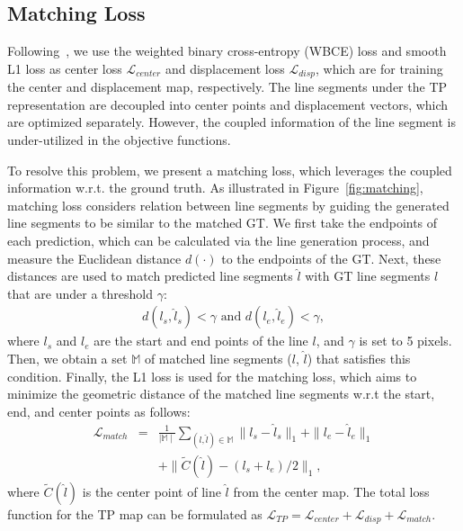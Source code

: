 \documentclass[letterpaper]{article} \usepackage{aaai22}  \usepackage{times}  \usepackage{helvet}  \usepackage{courier}  \usepackage[hyphens]{url}  \usepackage{graphicx} \urlstyle{rm} \def\UrlFont{\rm}  \usepackage{natbib}  \usepackage{caption} \DeclareCaptionStyle{ruled}{labelfont=normalfont,labelsep=colon,strut=off} \frenchspacing  \setlength{\pdfpagewidth}{8.5in}  \setlength{\pdfpageheight}{11in}  \usepackage{algorithm}
\begin{document}
\subsection{Matching Loss}
Following~\cite{huang2020tp}, we use the weighted binary cross-entropy (WBCE) loss and smooth L1 loss as center loss $\mathcal L_{center}$ and displacement loss $\mathcal L_{disp}$, which are for training the center and displacement map, respectively.
The line segments under the TP representation are decoupled into center points and displacement vectors, which are optimized separately.
However, the coupled information of the line segment is under-utilized in the objective functions.

To resolve this problem, we present a matching loss, which leverages the coupled information w.r.t. the ground truth.
As illustrated in Figure~\ref{fig:matching}, matching loss considers relation between line segments by guiding the generated line segments to be similar to the matched GT.
We first take the endpoints of each prediction, which can be calculated via the line generation process, and measure the Euclidean distance $d(\cdot)$ to the endpoints of the GT.
Next, these distances are used to match predicted line segments $\hat l$ with GT line segments $l$ that are under a threshold $\gamma$:
\begin{eqnarray}
d(l_s, \hat{l}_s) < \gamma \text{ and } d(l_e, \hat{l}_e) < \gamma,
\end{eqnarray}
where $l_s$ and $l_e$ are the start and end points of the line $l$, and $\gamma$ is set to 5 pixels.
Then, we obtain a set $\mathbb{M}$ of matched line segments ($l$, $\hat l$) that satisfies this condition.
Finally, the L1 loss is used for the matching loss, which aims to minimize the geometric distance of the matched line segments w.r.t the start, end, and center points as follows:
\begin{eqnarray}
\mathcal L_{match}&=&\frac{1}{\mid\mathbb{M}\mid}\sum_{(l,\hat{l}) \in \mathbb{M}} \parallel l_s-\hat{l}_s \parallel_1 + \parallel l_e-\hat{l}_e \parallel_1 \nonumber \\
&&+\parallel \tilde C(\hat{l})-(l_s + l_e)/2 \parallel_1,
\end{eqnarray}
where $\tilde C(\hat{l})$ is the center point of line $\hat{l}$ from the center map.
The total loss function for the TP map can be formulated as $\mathcal L_{TP} =  \mathcal L_{center}  + \mathcal L_{disp} + \mathcal L_{match}$.
\end{document}
